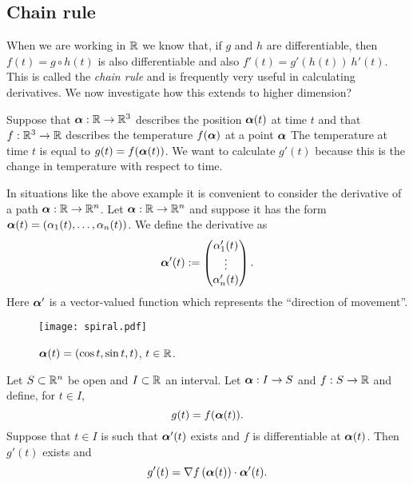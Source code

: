 \subsection*{Chain rule}

When we are working in \(\mathbb{R}\) we know that, if \(g\) and \(h\) are differentiable, then \(f(t) = g\circ h(t)\) is also differentiable and also \(f'(t) = g'(h(t)) \ h'(t)\).
This is called the \emph{chain rule} and is frequently very useful in calculating derivatives.
We now investigate how this extends to higher dimension?

\begin{example*}
    Suppose that
    \(\boldsymbol{\alpha}:\mathbb{R} \to \mathbb{R}^3\) describes the position \(\boldsymbol{\alpha}(t)\) at time \(t\)
    and that
    \(f:\mathbb{R}^3 \to \mathbb{R}\) describes the temperature \(f(\boldsymbol{\alpha})\) at a point \(\boldsymbol{\alpha}\)
    The temperature at time \(t\) is equal to \(g(t)=f(\boldsymbol{\alpha}(t))\).
    We want to calculate \(g'(t)\) because this is the change in temperature with respect to time.
\end{example*}

In situations like the above example it is convenient to consider the derivative of a path \(\boldsymbol{\alpha}:\mathbb{R} \to \mathbb{R}^n\).
Let \(\boldsymbol{\alpha}:\mathbb{R} \to \mathbb{R}^n\) and suppose it has the form
\(\boldsymbol{\alpha}(t) = \left( \alpha_1(t), \ldots, \alpha_n(t)  \right)\).
We define the derivative as
\[
    \boldsymbol{\alpha}'(t) := \begin{pmatrix}
        \alpha_1'(t) \\
        \vdots  \\
        \alpha_n'(t)
    \end{pmatrix}.
\]
\noindent
Here \(\boldsymbol{\alpha}'\) is a vector-valued function which represents the ``direction of movement''.

\begin{figure}[htb]
    \begin{center}
        \texttt{[image: spiral.pdf]}
        \caption{\(\boldsymbol{\alpha}(t)=(\cos t, \sin t, t)\), \(t\in \mathbb{R}\).}%
        \label{fig:spiral}
    \end{center}
\end{figure}


\begin{theorem*}
    Let \(S\subset \mathbb{R}^n\) be open and \(I\subset \mathbb{R}\) an interval.
    Let \(\boldsymbol{\alpha}: I \to S\) and \(f:S \to \mathbb{R}\) and define, for \(t\in I\),
    \[
        g(t) = f (\boldsymbol{\alpha}(t)).
    \]
    Suppose that  \(t\in I\) is such that \(\boldsymbol{\alpha}'(t)\) exists and \(f\) is differentiable at \(\boldsymbol{\alpha}(t)\).
    Then \(g'(t)\) exists and
    \[
        g'(t) = \nabla f \left(\boldsymbol{\alpha}(t)\right) \cdot \boldsymbol{\alpha}'(t).
    \]
\end{theorem*}


